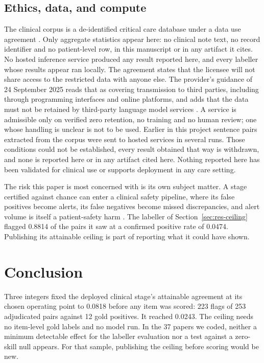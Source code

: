 \documentclass[review]{elsarticle}
\begin{document}
\subsection{Ethics, data, and compute}

The clinical corpus is a de-identified critical care database under a data use
agreement \cite{johnson2016mimic}. Only aggregate statistics appear here: no clinical note text, no record
identifier and no patient-level row, in this manuscript or in any artifact it
cites. No hosted inference service produced any result reported here, and
every labeller whose results appear ran locally. The agreement states that the licensee will
not share access to the restricted data with anyone else. The provider's
guidance of 24 September 2025 reads that as covering transmission to third
parties, including through programming interfaces and online platforms, and
adds that the data must not be retained by third-party language model services
\cite{physionet2025llm}. A service is admissible only on verified zero
retention, no training and no human review; one whose handling is unclear is not to
be used. Earlier in this project sentence pairs extracted from the corpus
were sent to hosted services in several runs. Those conditions could not be
established, every result obtained that way is withdrawn, and none is reported
here or in any artifact cited here. Nothing reported here has been validated for clinical use or
supports deployment in any care setting.

The risk this paper is most concerned with is its own subject matter. A stage
certified against chance can enter a clinical safety pipeline, where its false
positives become alerts, its false negatives become missed discrepancies, and
alert volume is itself a patient-safety harm
\cite{vandersijs2006overriding,ancker2017alertfatigue}. The labeller of
Section~\ref{sec:res-ceiling} flagged 0.8814 of the pairs it saw at a confirmed
positive rate of 0.0474. Publishing its attainable ceiling is part of reporting
what it could have shown.


\section{Conclusion}
\label{sec:conclusion}

Three integers fixed the deployed clinical stage's attainable agreement at its
chosen operating point to 0.0818 before any item was scored: 223 flags of 253
adjudicated pairs against 12 gold positives. It reached 0.0243. The ceiling needs
no item-level gold labels and no model run. In the 37 papers we
coded, neither a minimum detectable effect for the labeller evaluation nor a
test against a zero-skill null appears. For that sample, publishing the ceiling
before scoring would be new.
\end{document}
